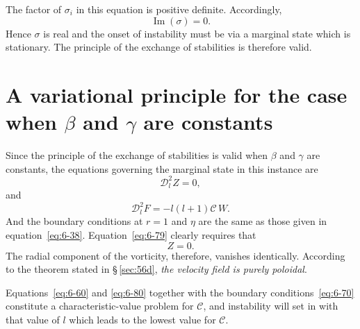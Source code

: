The factor of $\sigma_i$ in this equation is positive definite. Accordingly,
\begin{equation}\label{eq:6-78}
\operatorname{Im}(\sigma) = 0.
\end{equation}
Hence $\sigma$ is real and the onset of instability must be via a marginal state
which is stationary. The principle of the exchange of stabilities is
therefore valid.

\section{A variational principle for the case when $\beta$ and $\gamma$ are constants}\label{sec:58}
Since the principle of the exchange of stabilities is valid when $\beta$ and $\gamma$ are
constants, the equations governing the marginal state in this
instance are
\begin{equation}\label{eq:6-79}
\mathscr{D}_l^2 Z = 0,
\end{equation}
and
\begin{equation}\label{eq:6-80}
\mathscr{D}_l^2 F = -l(l+1)\mathcal{C}\,W.
\end{equation}
And the boundary conditions at $r = 1$ and $\eta$ are the same as those given
in equation~\eqref{eq:6-38}.
Equation~\eqref{eq:6-79} clearly requires that
\begin{equation}\label{eq:6-81}
Z = 0.
\end{equation}
The radial component of the vorticity, therefore, vanishes identically.
According to the theorem stated in \S\,\ref{sec:56d}, \emph{the velocity field is purely
poloidal}.

Equations~\eqref{eq:6-60} and \eqref{eq:6-80} together with the boundary conditions~\eqref{eq:6-70}
constitute a characteristic-value problem for $\mathcal{C}$, and instability will set
in with that value of $l$ which leads to the lowest value for $\mathcal{C}$.

